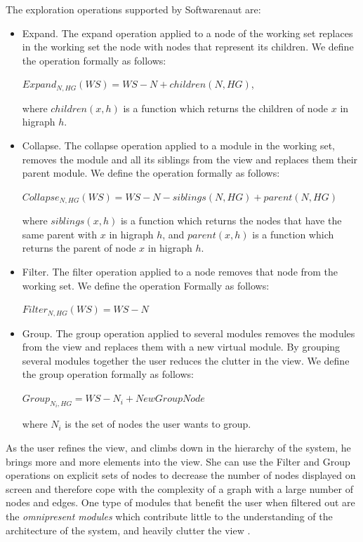 \documentclass[preprint,12pt]{elsarticle}
\begin{document}
The exploration operations supported by Softwarenaut are:

\begin{itemize}

\item Expand. The expand operation applied to a node of the working set replaces in the working set the node with nodes that represent its children. We define the operation formally as follows: 

\hspace{0.5cm} $ Expand_{N,HG} (WS) = WS - N + children (N, HG)$, 

where $children(x,h)$ is a function which returns the children of node $x$ in higraph $h$.

\item Collapse. The collapse operation applied to a module in the working set, removes the module and all its siblings from the view and replaces them their parent module. We define the operation formally as follows:

\hspace{0.5cm} $ Collapse_{N,HG} (WS) = WS - N - siblings (N, HG) + parent (N, HG)$

where $siblings(x,h)$ is a function which returns the nodes that have the same parent with $x$ in higraph $h$, and $parent(x,h)$ is a function which returns the parent of node $x$ in higraph $h$. 

\item Filter.
The filter operation applied to a node removes that node from the working set. We define the operation Formally as follows:

$ Filter_{N,HG} (WS) = WS - N$

\item Group.
The group operation applied to several modules removes the modules from the view and replaces them with a new virtual module. By grouping several modules together the user reduces the clutter in the view. We define the group operation formally as follows: 

$ Group_{N_{i},HG} = WS - N_i + NewGroupNode $

where $N_i$ is the set of nodes the user wants to group.


\end{itemize}

As the user refines the view, and climbs down in the hierarchy of the system, he brings more and more elements into the view. She can use the Filter and Group operations on explicit sets of nodes to decrease the number of nodes displayed on screen and therefore cope with the complexity of a graph with a large number of nodes and edges. One type of modules that benefit the user when filtered out are the {\em omnipresent modules} which contribute little to the understanding of the architecture of the system, and heavily clutter the view \cite{mitchell-bunch}.
\end{document}
